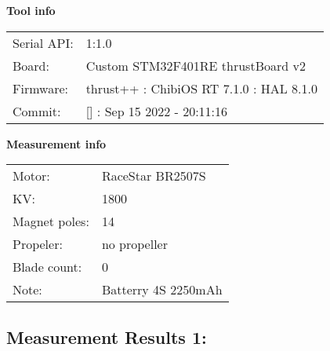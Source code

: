 \documentclass[10pt]{article}
\begin{document}
\noindent
{\large \bf Tool info}
\vspace{3mm}

\noindent
\begin{tabular}{ll}
Serial API:  & 1:1.0\\ 
Board:       & Custom STM32F401RE thrustBoard v2\\ 
Firmware:    & thrust++ : ChibiOS RT 7.1.0 : HAL 8.1.0\\ 
Commit:      & [] : Sep 15 2022 - 20:11:16
\end{tabular}
\vspace{3mm}

\noindent
{\large \bf Measurement info}
\vspace{3mm}

\noindent
\begin{tabular}{ll}
Motor:        & RaceStar BR2507S\\ 
KV:           & 1800\\ 
Magnet poles: & 14\\ 
Propeler:     & no propeller\\ 
Blade count:  & 0\\ 
Note:         & Batterry 4S 2250mAh
\end{tabular}

\vspace{3mm}


\subsection*{\large \bf Measurement Results 1:}
\end{document}

